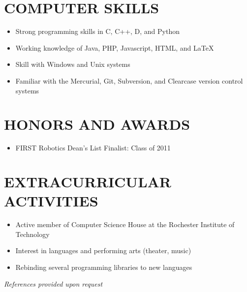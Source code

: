 \documentclass{res}
\begin{document}
\begin{resume}
\section{COMPUTER SKILLS}
	\begin{itemize}
    \item Strong programming skills in C, C++, D, and Python
    \item Working knowledge of Java, PHP, Javascript, HTML, and LaTeX
    \item Skill with Windows and Unix systems
    \item Familiar with the Mercurial, Git, Subversion, and Clearcase version control systems
    \end{itemize}


\section{HONORS AND AWARDS}
	\begin{itemize}
    \item FIRST Robotics Dean's List Finalist: Class of 2011
    \end{itemize}

\section{EXTRACURRICULAR ACTIVITIES}
	\begin{itemize}
    \item Active member of Computer Science House at the Rochester Institute of Technology
    \item Interest in languages and performing arts (theater, music)
    \item Rebinding several programming libraries to new languages
    \end{itemize}

\begin{center}
\hspace{-0.8in}\emph{References provided upon request\\[8pt]}
\end{center}

\end{resume}
\end{document}
